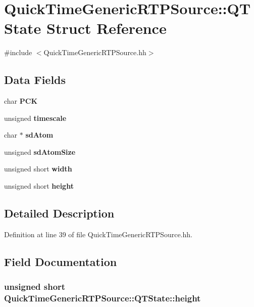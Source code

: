 \section{Quick\+Time\+Generic\+R\+T\+P\+Source\+:\+:Q\+T\+State Struct Reference}
\label{structQuickTimeGenericRTPSource_1_1QTState}


{\ttfamily \#include $<$Quick\+Time\+Generic\+R\+T\+P\+Source.\+hh$>$}

\subsection*{Data Fields}
\begin{DoxyCompactItemize}
\item 
char {\bf P\+C\+K}
\item 
unsigned {\bf timescale}
\item 
char $\ast$ {\bf sd\+Atom}
\item 
unsigned {\bf sd\+Atom\+Size}
\item 
unsigned short {\bf width}
\item 
unsigned short {\bf height}
\end{DoxyCompactItemize}


\subsection{Detailed Description}


Definition at line 39 of file Quick\+Time\+Generic\+R\+T\+P\+Source.\+hh.



\subsection{Field Documentation}
\subsubsection[{height}]{\setlength{\rightskip}{0pt plus 5cm}unsigned short Quick\+Time\+Generic\+R\+T\+P\+Source\+::\+Q\+T\+State\+::height}\label{structQuickTimeGenericRTPSource_1_1QTState_adc2f0cadc309439389745cb95c154462}


